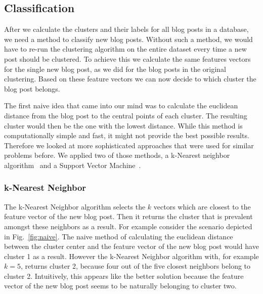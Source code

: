 
\subsection{Classification}
\label{sec:classification}

After we calculate the clusters and their labels for all blog posts in a database, we need a method to classify new blog posts.
Without such a method, we would have to re-run the clustering algorithm on the entire dataset every time a new post should be clustered.
To achieve this we calculate the same features vectors for the single new blog post, as we did for the blog posts in the original clustering.
Based on these feature vectors we can now decide to which cluster the blog post belongs.


The first naive idea that came into our mind was to calculate the euclidean distance from the blog post to the central points of each cluster.
The resulting cluster would then be the one with the lowest distance.
While this method is computationally simple and fast, it might not provide the best possible results.
Therefore we looked at more sophisticated approaches that were used for similar problems before.
We applied two of those methods, a k-Nearest neighbor algorithm~\cite{peterson2009k} and a Support Vector Machine~\cite{kolari2006svms}.


\subsubsection{k-Nearest Neighbor}
\label{sec:k_nearest_neighbor}


The k-Nearest Neighbor algorithm selects the $k$ vectors which are closest to the feature vector of the new blog post.
Then it returns the cluster that is prevalent amongst these neighbors as a result.
For example consider the scenario depicted in Fig.~\ref{fig:naive}.
The naive method of calculating the euclidean distance between the cluster center and the feature vector of the new blog post would have cluster 1 as a result.
However the k-Nearest Neighbor algorithm with, for example $k=5$, returns cluster 2, because four out of the five closest neighbors belong to cluster 2.
Intuitively, this appears like the better solution because the feature vector of the new blog post seems to be naturally belonging to cluster two.


